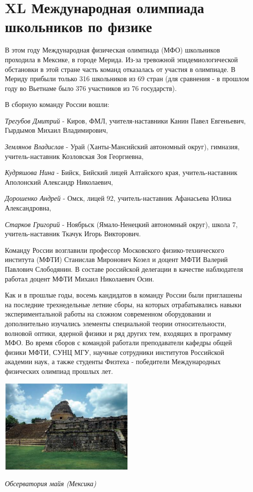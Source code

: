 \section*{\centering XL Международная олимпиада школьников по физике}
\begin{multicols*}{2}
    \footnotesize В этом году Международная физическая олимпиада (МФО) школьников проходила в Мексике, в городе Мерида. Из-за тревожной эпидемиологической обстановки в этой стране часть команд отказалась от участия в олимпиаде. В Мериду прибыли только 316 школьников из 69 стран (для сравнения - в прошлом году во Вьетнаме было 376 участников из 76 государств).
    
    В сборную команду России вошли:
    
    \textit{Трегубов Дмитрий} - Киров, ФМЛ, учителя-наставники Канин Павел Евгеньевич, Гырдымов Михаил Владимирович,
    
    \textit{Землянов Владислав} - Урай (Ханты-Мансийский автономный округ), гимназия, учитель-наставник Козловская Зоя Георгиевна,
    
    \textit{Кудряшова Нина} - Бийск, Бийский лицей Алтайского края, учитель-наставник Аполонский Александр Николаевич,
    
    \textit{Дорошенко Андрей} - Омск, лицей 92, учитель-наставник Афанасьева Юлика Александровна,
   
    \textit{Старков Григорий} - Ноябрьск (Ямало-Ненецкий автономный округ), школа 7, учитель-наставник Ткачук Игорь Викторович.
    
    Команду России возглавили профессор Московского физико-технического института (МФТИ) Станислав Миронович Козел и доцент МФТИ Валерий Павлович Слободянин. В составе российской делегации в качестве наблюдателя работал доцент МФТИ Михаил Николаевич Осин.
    
    Как и в прошлые годы, восемь кандидатов в команду России были приглашены на последние трехнедельные летние сборы, на которых отрабатывались навыки экспериментальной работы на сложном современном оборудовании и дополнительно изучались элементы специальной теории относительности, волновой оптики, ядерной физики и ряд других тем, входящих в программу МФО. Во время сборов с командой работали преподаватели кафедры общей физики МФТИ, СУНЦ МГУ, научные сотрудники институтов Российской академии наук, а также студенты Физтеха - победители Международных физических олимпиад прошлых лет.
    
    \begin{center}
        \includegraphics[width=0.5\textwidth]{observatory.png}
    \end{center}
    \textit{Обсерватория майя (Мексика)}
    

\end{multicols*}
